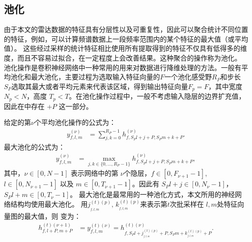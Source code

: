 \subsection{池化}
由于本文的雷达数据的特征具有分层性以及可重复性，因此可以聚合统计不同位置的特征，例如，可以计算频谱数据上一段频率范围内的某个特征的最大值（或平均值）。
这些经过采样的统计特征相比使用所有提取得到的特征不仅具有低得多的维度，而且不容易过拟合，在一定程度上会改善结果。这种聚合的操作称为池化。
池化操作是卷积神经网络中一种常用的用来对数据进行降维处理的方法。一般有平均池化和最大池化，主要过程为选取输入特征向量的$F$一个池化感受野$R_P$和步长$S_P$选取其最大或者平均元素来代表该区域，得到输出特征向量$F_p=F$，其中宽度 $N_p<N$，高度 $T_p<T$。在池化操作过程中，一般不考虑输入隐层的边界扩充值，因此在中存在 $+P$ 这一部分。

给定的第$\nu$个平均池化操作的公式为：
\begin{align}
  y_{f,l,m}^{(\nu)}&=\sum^{R_P-1}_{j,k=0} h_{f,S_Pl+j+P,S_Pm+k+P}^{(\nu)}.
  \label{equ:pool}
\end{align}
最大池化的公式为：
\begin{align}
  y_{f,l,m}^{(\nu)}&=\max_{j,k \in \{0, \ldots, R_P-1\}} h_{f,S_Pl+j+P,S_Pm+k+P}^{(\nu)},
  \label{equ:maxpool}
\end{align}
其中，$\nu \in [0,N-1 ]$ 表示网络中的第 $\nu$个隐层，$f\in[0,F_{\nu+1}-1]$, $l\in[0,N_{\nu+1}-1 ]$ 以及 $m\in[0,T_{\nu+1}-1 ]$。因此有 $S_Pl+j\in[0,N_\nu-1 ]$， $S_Pl+m\in[0,T_\nu-1 ]$。
最大池化是最常用的一种池化方式，本文所用的神经网络结构均使用最大池化。
用$j^{(t)(p)}_{_{f,l,m}},\,k^{(t)(p)}_{_{f,l,m}}$来表示第$t$次批采样在 $l,m$处特征向量图的最大值，则 变为：
\begin{align}
h_{f,l+P,m+P}^{(t)(\nu+1)}&=y_{f,l,m}^{(t)(\nu)}=
h^{(t)(\nu)}_{f,S_P l+j^{(t)(p)}_{_{f,l,m}}+P,S_Pm+k^{(t)(p)}_{_{f,l,m}}+P}.
\end{align}

